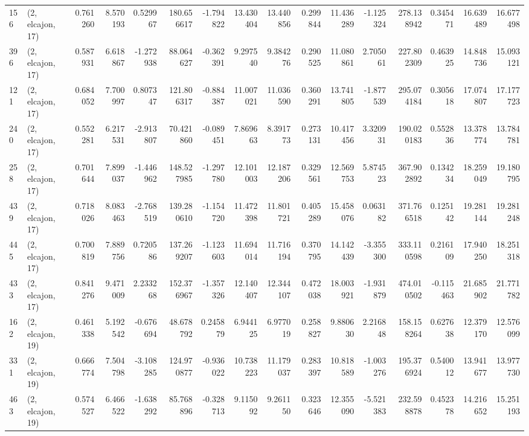 \begin{tabular}{llrrrrrrrrrrrrrr}
156 &  (2, elcajon, 17) &   0.761260 &   8.570193 &   0.529967 &   180.656617 &  -1.794822 &  13.430404 &  13.440856 &  0.299844 &  11.436289 &  -1.125324 &   278.138942 &  0.345471 &  16.639489 &  16.677498 \\
396 &  (2, elcajon, 17) &   0.587931 &   6.618867 &  -1.272938 &    88.064627 &  -0.362391 &   9.297540 &   9.384276 &  0.290525 &  11.080861 &   2.705061 &   227.802309 &  0.463925 &  14.848736 &  15.093121 \\
121 &  (2, elcajon, 17) &   0.684052 &   7.700997 &   0.807347 &   121.806317 &  -0.884387 &  11.007021 &  11.036590 &  0.360291 &  13.741805 &  -1.877539 &   295.074184 &  0.305618 &  17.074807 &  17.177723 \\
240 &  (2, elcajon, 17) &   0.552281 &   6.217531 &  -2.913807 &    70.421860 &  -0.089451 &   7.869663 &   8.391773 &  0.273131 &  10.417456 &   3.320931 &   190.020183 &  0.552836 &  13.378774 &  13.784781 \\
258 &  (2, elcajon, 17) &   0.701644 &   7.899037 &  -1.446962 &   148.527985 &  -1.297780 &  12.101003 &  12.187206 &  0.329561 &  12.569753 &   5.874523 &   367.902892 &  0.134234 &  18.259049 &  19.180795 \\
439 &  (2, elcajon, 17) &   0.718026 &   8.083463 &  -2.768519 &   139.280610 &  -1.154720 &  11.472398 &  11.801721 &  0.405289 &  15.458076 &   0.063182 &   371.766518 &  0.125142 &  19.281144 &  19.281248 \\
445 &  (2, elcajon, 17) &   0.700819 &   7.889756 &   0.720586 &   137.269207 &  -1.123603 &  11.694014 &  11.716194 &  0.370795 &  14.142439 &  -3.355300 &   333.110598 &  0.216109 &  17.940250 &  18.251318 \\
433 &  (2, elcajon, 17) &   0.841276 &   9.471009 &   2.233268 &   152.376967 &  -1.357326 &  12.140407 &  12.344107 &  0.472038 &  18.003921 &  -1.931879 &   474.010502 & -0.115463 &  21.685902 &  21.771782 \\
162 &  (2, elcajon, 19) &   0.461338 &   5.192542 &  -0.676694 &    48.678792 &   0.245879 &   6.944125 &   6.977019 &  0.258827 &   9.880630 &   2.216848 &   158.158264 &  0.627638 &  12.379170 &  12.576099 \\
331 &  (2, elcajon, 19) &   0.666774 &   7.504798 &  -3.108285 &   124.970877 &  -0.936022 &  10.738223 &  11.179037 &  0.283397 &  10.818589 &  -1.003276 &   195.376924 &  0.540012 &  13.941677 &  13.977730 \\
463 &  (2, elcajon, 19) &   0.574527 &   6.466522 &  -1.638292 &    85.768896 &  -0.328713 &   9.115092 &   9.261150 &  0.323646 &  12.355090 &  -5.521383 &   232.598878 &  0.452378 &  14.216652 &  15.251193 \\

\end{tabular}
